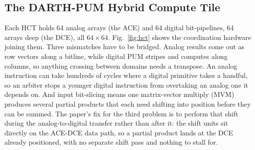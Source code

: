 \documentclass[conference]{IEEEtran}
\begin{document}
\subsection{The DARTH-PUM Hybrid Compute Tile}

Each HCT holds 64 analog arrays (the ACE) and 64 digital bit-pipelines, 64
arrays deep (the DCE), all $64\times64$. Fig.~\ref{fig:hct} shows the
coordination hardware joining them. Three mismatches have to be bridged.
Analog results come out as row vectors along a bitline, while digital PUM
stripes and computes along columns, so anything crossing between domains
needs a transpose. An analog instruction can take hundreds of cycles where a
digital primitive takes a handful, so an arbiter stops a younger digital
instruction from overtaking an analog one it depends on. And input
bit-slicing means one matrix-vector multiply (MVM) produces several partial
products that each need shifting into position before they can be summed.
The paper's fix for the third problem is to perform that shift during the
analog-to-digital transfer rather than after it: the shift units sit
directly on the ACE-DCE data path, so a partial product lands at the DCE
already positioned, with no separate shift pass and nothing to stall for.
\end{document}
